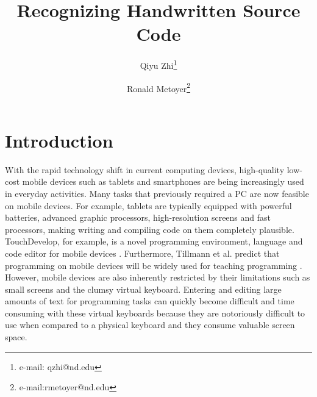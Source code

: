 \documentclass{vgtc}                          %
\title{Recognizing Handwritten Source Code}
\author{Qiyu Zhi\thanks{e-mail: qzhi@nd.edu} %
\and Ronald Metoyer\thanks{e-mail:rmetoyer@nd.edu}}
\affiliation{\scriptsize University of Notre Dame}
\begin{document}


\maketitle

\section{Introduction} %
With the rapid technology shift in current computing devices, high-quality low-cost mobile devices such as tablets and smartphones are being increasingly used in everyday activities. Many tasks that previously required a PC are now feasible on mobile devices. For example, tablets are typically equipped with powerful batteries, advanced graphic processors, high-resolution screens and fast processors, making writing and compiling code on them completely plausible. TouchDevelop, for example, is a novel programming environment, language and code editor for mobile devices  \cite{tillmann2011touchdevelop}. Furthermore, Tillmann et al. predict that programming on mobile devices will be widely used for teaching programming \cite{tillmann2012future}.  However, mobile devices are also inherently restricted by their limitations such as small screens and the clumsy virtual keyboard.  Entering and editing large amounts of text for programming tasks can quickly become difficult and time consuming with these virtual keyboards because they are notoriously difficult to use when compared to a physical keyboard and they consume valuable screen space\cite{raab2013refactorpad}.

\end{document}
